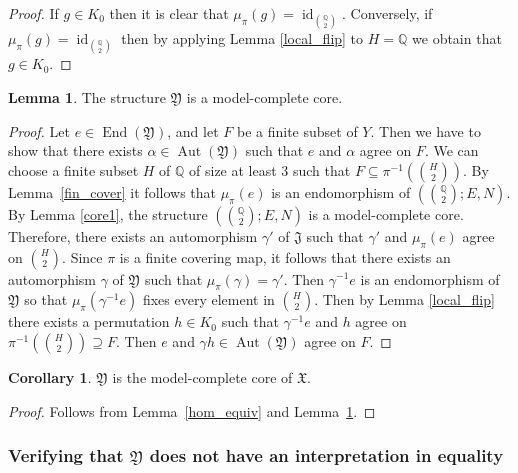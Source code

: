 \documentclass{amsart}
\theoremstyle{definition}
\newtheorem{lemma}[theorem]{Lemma}
\newtheorem{corollary}[theorem]{Corollary}
\theoremstyle{remark}
\numberwithin{equation}{section}
\newcommand{\aut}{\operatorname{Aut}}
\newcommand{\eend}{\operatorname{End}}
\newcommand{\id}{\operatorname{id}}
\newcommand{\upairs}{{{\mathbb Q}\choose 2}}
\newcommand{\john}{\mathfrak{J}}
\newcommand{\fb}{\mathfrak{B}}
\newcommand{\fx}{\mathfrak{X}}
\newcommand{\fy}{\mathfrak{Y}}
\newcommand{\Aut}{\operatorname{Aut}}
\newcommand{\kernel}{\operatorname{Ker}}
\begin{document}
\begin{proof}
	If $g\in K_0$ then it is clear that $\mu_{\pi}(g) =\id_{\upairs}$. 
	Conversely, if $\mu_\pi(g) = \id_{\upairs}$ then by applying Lemma \ref{local_flip} to $H=\mathbb Q$ we obtain that $g\in K_0$.
\end{proof}

\begin{lemma}\label{core2}
	The structure $\fy$ is a model-complete core.
\end{lemma}

\begin{proof}
    Let $e\in \eend(\fy)$, and let $F$ be a finite subset of $Y$. Then we have to show that there exists $\alpha \in \Aut(\fy)$ such that $e$ and $\alpha$ agree on $F$. We can choose a finite subset $H$ of ${\mathbb Q}$ of size at least 3 such that $F\subseteq \pi^{-1}({H\choose 2})$. By Lemma~\ref{fin_cover} it follows that $\mu_{\pi}(e)$ is an endomorphism of $(\upairs;E,N)$. By Lemma \ref{core1}, the structure $(\upairs;E,N)$ is a model-complete core. Therefore, there exists an automorphism $\gamma'$ of $\john$ such that $\gamma'$ and $\mu_{\pi}(e)$ agree on ${H\choose 2}$. Since $\pi$ is a finite covering map, it follows that there exists an automorphism $\gamma$ of $\fy$ such that $\mu_{\pi}(\gamma)=\gamma'$. Then ${\gamma^{-1}e}$ is an endomorphism of $\fy$ so that $\mu_{\pi}({\gamma^{-1}e})$ fixes every element in ${H\choose 2}$. Then by Lemma \ref{local_flip} there exists a permutation $h\in K_0$ such that ${\gamma^{-1}e}$ and $h$ agree on ${\pi^{-1}}({H\choose 2})\supseteq F$. Then $e$ and ${\gamma h}\in \aut(\fy)$ agree on $F$.%
\end{proof}


\begin{corollary}\label{mc_core}
	$\fy$ is the model-complete core of $\fx$.
\end{corollary}

\begin{proof}
Follows from Lemma~\ref{hom_equiv} and Lemma~\ref{core2}.
\end{proof}

\subsubsection{Verifying that $\fy$ does not have an interpretation in  equality} 
\end{document}
